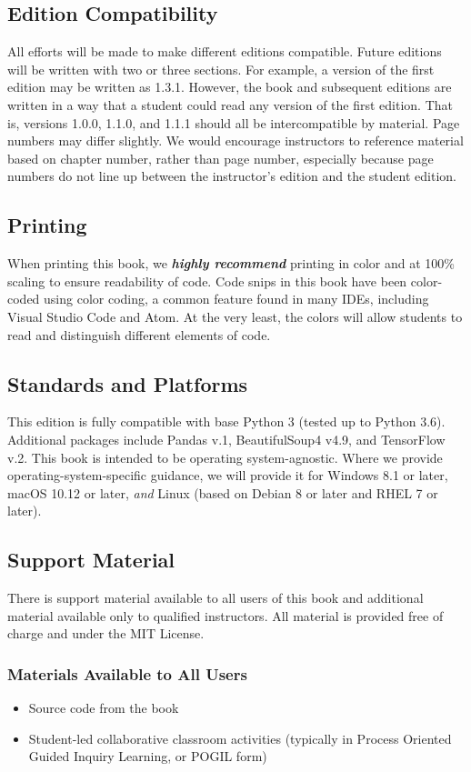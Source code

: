 \subsection*{Edition Compatibility}
All efforts will be made to make different editions compatible. Future editions will be written with two or three sections. For example, a version of the first edition may be written as 1.3.1. However, the book and subsequent editions are written in a way that a student could read any version of the first edition. That is, versions 1.0.0, 1.1.0, and 1.1.1 should all be intercompatible by material. Page numbers may differ slightly. We would encourage instructors to reference material based on chapter number, rather than page number, especially because page numbers do not line up between the instructor's edition and the student edition.\par
\subsection*{Printing}
When printing this book, we \textbf{\textit{highly recommend}} printing in color and at 100\% scaling to ensure readability of code. Code snips in this book have been color-coded using color coding, a common feature found in many IDEs, including Visual Studio Code and Atom. At the very least, the colors will allow students to read and distinguish different elements of code.\par
\subsection*{Standards and Platforms}
This edition is fully compatible with base Python 3 (tested up to Python 3.6). Additional packages include Pandas v.1, BeautifulSoup4 v4.9, and TensorFlow v.2. This book is intended to be operating system-agnostic. Where we provide operating-system-specific guidance, we will provide it for Windows 8.1 or later, macOS 10.12 or later, \textit{and} Linux (based on Debian 8 or later and RHEL 7 or later).
\subsection*{Support Material}
There is support material available to all users of this book and additional material available only to qualified instructors. All material is provided free of charge and under the MIT License.
\subsubsection*{Materials Available to All Users}
\begin{itemize}
    \item {Source code from the book}
    \item {Student-led collaborative classroom activities (typically in Process Oriented Guided Inquiry Learning, or POGIL form)}
\end{itemize}
